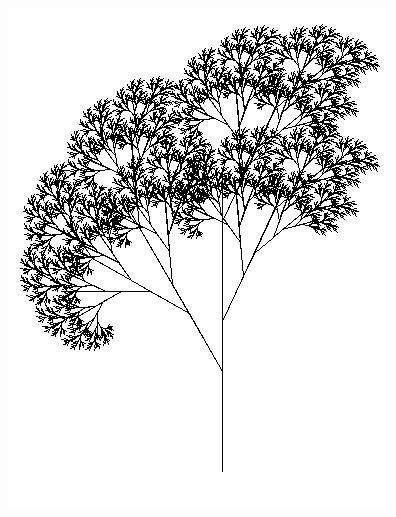 \documentclass[rgb]{beamer}
\begin{document}
\begin{frame}[fragile]
\begin{footnotesize}
\begin{minipage}[b]{0.3\textwidth}
  \includegraphics[width=\textwidth]{../images/RecursiveTree.JPG}
\end{minipage}
\end{footnotesize}
\end{frame}
\end{document}
